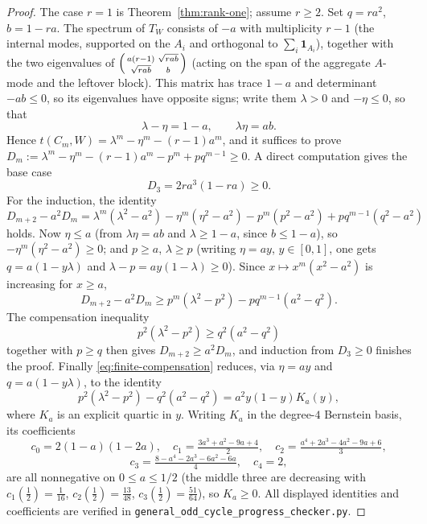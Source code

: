 \documentclass[11pt]{article}
\begin{document}
\begin{proof}
The case $r=1$ is Theorem~\ref{thm:rank-one}; assume $r\ge2$.  Set $q=ra^2$, $b=1-ra$.  The spectrum of $T_W$ consists of $-a$ with multiplicity $r-1$ (the internal modes, supported on the $A_i$ and orthogonal to $\sum_i\mathbf 1_{A_i}$), together with the two eigenvalues of $\begin{psmallmatrix} a(r-1) & \sqrt{rab}\\ \sqrt{rab} & b\end{psmallmatrix}$ (acting on the span of the aggregate $A$-mode and the leftover block).  This matrix has trace $1-a$ and determinant $-ab\le0$, so its eigenvalues have opposite signs; write them $\lambda>0$ and $-\eta\le0$, so that
\[
        \lambda-\eta=1-a,\qquad \lambda\eta=ab.
\]
Hence $t(C_m,W)=\lambda^m-\eta^m-(r-1)a^m$, and it suffices to prove $D_m:=\lambda^m-\eta^m-(r-1)a^m-p^m+pq^{m-1}\ge0$.  A direct computation gives the base case
\[
        D_3=2ra^3(1-ra)\ge0.
\]
For the induction, the identity
\[
        D_{m+2}-a^2D_m=\lambda^m(\lambda^2-a^2)-\eta^m(\eta^2-a^2)-p^m(p^2-a^2)+pq^{m-1}(q^2-a^2)
\]
holds.  Now $\eta\le a$ (from $\lambda\eta=ab$ and $\lambda\ge1-a$, since $b\le1-a$), so $-\eta^m(\eta^2-a^2)\ge0$; and $p\ge a$, $\lambda\ge p$ (writing $\eta=ay$, $y\in[0,1]$, one gets $q=a(1-y\lambda)$ and $\lambda-p=ay(1-\lambda)\ge0$).  Since $x\mapsto x^m(x^2-a^2)$ is increasing for $x\ge a$,
\[
        D_{m+2}-a^2D_m\ge p^m(\lambda^2-p^2)-pq^{m-1}(a^2-q^2).
\]
The compensation inequality
\begin{equation}\label{eq:finite-compensation}
        p^2(\lambda^2-p^2)\ge q^2(a^2-q^2)
\end{equation}
together with $p\ge q$ then gives $D_{m+2}\ge a^2D_m$, and induction from $D_3\ge0$ finishes the proof.  Finally \eqref{eq:finite-compensation} reduces, via $\eta=ay$ and $q=a(1-y\lambda)$, to the identity
\[
        p^2(\lambda^2-p^2)-q^2(a^2-q^2)=a^2y(1-y)K_a(y),
\]
where $K_a$ is an explicit quartic in $y$.  Writing $K_a$ in the degree-$4$ Bernstein basis, its coefficients
\[
        c_0=2(1-a)(1-2a),\quad c_1=\tfrac{3a^3+a^2-9a+4}{2},\quad c_2=\tfrac{a^4+2a^3-4a^2-9a+6}{3},
\]
\[
        c_3=\tfrac{8-a^4-2a^3-6a^2-6a}{4},\quad c_4=2,
\]
are all nonnegative on $0\le a\le1/2$ (the middle three are decreasing with $c_1(\tfrac12)=\tfrac1{16}$, $c_2(\tfrac12)=\tfrac{13}{48}$, $c_3(\tfrac12)=\tfrac{51}{64}$), so $K_a\ge0$.  All displayed identities and coefficients are verified in \texttt{general\_odd\_cycle\_progress\_checker.py}.
\end{proof}
\end{document}
